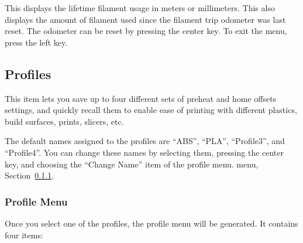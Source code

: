This displays the lifetime filament usage in meters or millimeters.  This also displays the amount of filament used since the filament trip odometer was last reset.  The odometer can be reset by pressing the center key.  To exit the menu, press the left key.


\subsection{Profiles} \label{sec:profiles}

This item lets you save up to four different sets of preheat and home offsets settings, and quickly recall them to enable ease of printing with different plastics, build surfaces, prints, slicers, etc.

The default names assigned to the profiles are ``ABS'', ``PLA'', ``Profile3'', and ``Profile4''.  You can change these names by selecting them, pressing the center key, and choosing the ``Change Name'' item of the profile
\ifpdf
menu.
\else
menu, Section~\ref{sec:profile-menu}.
\fi


\subsubsection{Profile Menu} \label{sec:profile-menu}

Once you select one of the profiles, the profile menu will be generated.  It contains four items:

